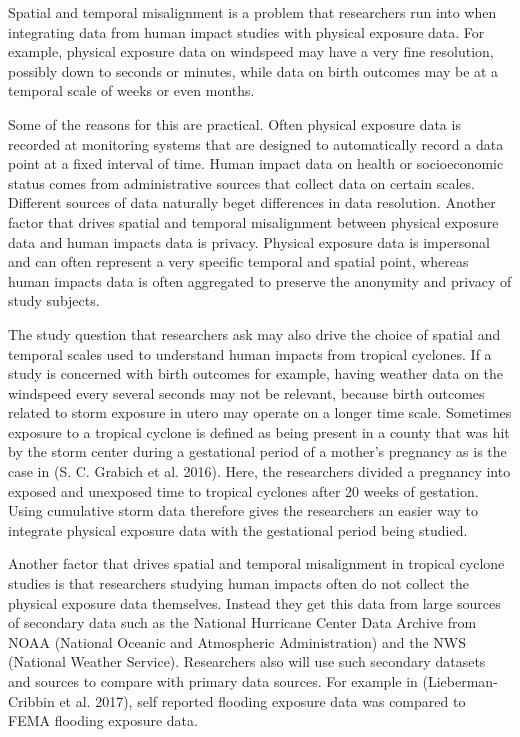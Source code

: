 \documentclass[]{article}
\begin{document}
Spatial and temporal misalignment is a problem that researchers run into
when integrating data from human impact studies with physical exposure
data. For example, physical exposure data on windspeed may have a very
fine resolution, possibly down to seconds or minutes, while data on
birth outcomes may be at a temporal scale of weeks or even months.

Some of the reasons for this are practical. Often physical exposure data
is recorded at monitoring systems that are designed to automatically
record a data point at a fixed interval of time. Human impact data on
health or socioeconomic status comes from administrative sources that
collect data on certain scales. Different sources of data naturally
beget differences in data resolution. Another factor that drives spatial
and temporal misalignment between physical exposure data and human
impacts data is privacy. Physical exposure data is impersonal and can
often represent a very specific temporal and spatial point, whereas
human impacts data is often aggregated to preserve the anonymity and
privacy of study subjects.

The study question that researchers ask may also drive the choice of
spatial and temporal scales used to understand human impacts from
tropical cyclones. If a study is concerned with birth outcomes for
example, having weather data on the windspeed every several seconds may
not be relevant, because birth outcomes related to storm exposure in
utero may operate on a longer time scale. Sometimes exposure to a
tropical cyclone is defined as being present in a county that was hit by
the storm center during a gestational period of a mother's pregnancy as
is the case in (S. C. Grabich et al. 2016). Here, the researchers
divided a pregnancy into exposed and unexposed time to tropical cyclones
after 20 weeks of gestation. Using cumulative storm data therefore gives
the researchers an easier way to integrate physical exposure data with
the gestational period being studied.

Another factor that drives spatial and temporal misalignment in tropical
cyclone studies is that researchers studying human impacts often do not
collect the physical exposure data themselves. Instead they get this
data from large sources of secondary data such as the National Hurricane
Center Data Archive from NOAA (National Oceanic and Atmospheric
Administration) and the NWS (National Weather Service). Researchers also
will use such secondary datasets and sources to compare with primary
data sources. For example in (Lieberman-Cribbin et al. 2017), self
reported flooding exposure data was compared to FEMA flooding exposure
data.
\end{document}
